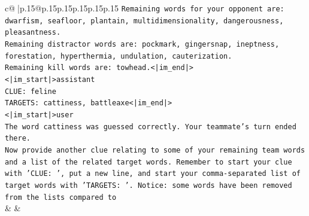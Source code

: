 \documentclass{article}
\begin{document}
{\begin{supertabular}{c@{$\;$}|p{.15\linewidth}@{}p{.15\linewidth}p{.15\linewidth}p{.15\linewidth}p{.15\linewidth}p{.15\linewidth}}
{{{\texttt{Remaining words for your opponent are: dwarfism, seafloor, plantain, multidimensionality, dangerousness, pleasantness.} \\
\texttt{Remaining distractor words are: pockmark, gingersnap, ineptness, forestation, hyperthermia, undulation, cauterization.} \\
\texttt{Remaining kill words are: towhead.<|im\_end|>} \\
\texttt{<|im\_start|>assistant} \\
\texttt{CLUE: feline} \\
\texttt{TARGETS: cattiness, battleaxe<|im\_end|>} \\
\texttt{<|im\_start|>user} \\
\texttt{The word cattiness was guessed correctly. Your teammate's turn ended there.} \\
\texttt{Now provide another clue relating to some of your remaining team words and a list of the related target words. Remember to start your clue with 'CLUE: ', put a new line, and start your comma{-}separated list of target words with 'TARGETS: '. Notice: some words have been removed from the lists compared to} \\
            }
        }
    }
    & & \\ \\


\end{supertabular}}
\end{document}
